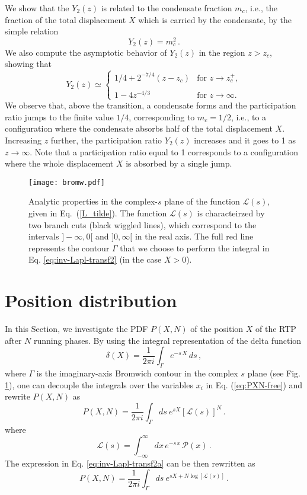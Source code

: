 \documentclass[aps,pre,twocolumn,superscriptaddress,showpacs]{revtex4-1}
\newcommand{\be}{\begin{equation}}
\newcommand{\ee}{\end{equation}}
\newcommand{\mP}{\mathcal{P}}
\newcommand{\mL}{\mathcal{L}}
\begin{document}
We show that the $Y_2(z)$ is related to the condensate fraction $m_c$, i.e., the fraction of the total displacement $X$ which is carried by the condensate, by the simple relation
\begin{equation}
Y_2(z)=m_c^2\,.
\end{equation} 
We also compute the asymptotic behavior of $Y_2(z)$ in the region $z>z_c$, showing that
\begin{equation}
Y_2(z)\simeq\begin{cases}
1/4+2^{-7/4}(z-z_c) & \text{for } z\to z_c^+,\\
\\
1-4 z^{-4/3} & \text{for } z\to\infty.
\end{cases}
\label{mc_lim}
\end{equation}
We observe that, above the transition, a condensate forms and the participation ratio jumps to the finite value $1/4$, corresponding to $m_c=1/2$, i.e., to a configuration where the condensate absorbs half of the total displacement $X$. Increasing $z$ further, the participation ratio $Y_2(z)$ increases and it goes to 1 as $z\to\infty$. Note that a participation ratio equal to 1 corresponds to a configuration where the whole displacement $X$ is absorbed by a single jump.








\begin{figure}
\centering 

\texttt{[image: bromw.pdf]} 
\caption{Analytic properties in the complex-$s$ plane of the function $\mL(s)$, given in Eq.~(\ref{L_tilde}). The function $\mL(s)$ is characteirzed by two branch cuts (black wiggled lines), which correspond to the intervals $]-\infty,0[$ and $]0,\infty[$ in the real axis. The full red line represents the contour $\Gamma$ that we choose to perform the integral in Eq. \eqref{eq:inv-Lapl-transf2} (in the case $X>0$).}
\label{fig:Bromwich}
\end{figure}


\section{Position distribution}

\label{sec:position}


In this Section, we investigate the PDF $P(X,N)$ of the position $X$ of the RTP after $N$ running phases. By using the integral representation
of the delta function
\be
\delta(X)= \frac{1}{2\pi i}\int_{\Gamma} e^{- s\, X}\, ds\,,
\ee
where $\Gamma$ is the imaginary-axis Bromwich contour in the complex $s$ plane (see Fig. \ref{fig:Bromwich}), one can decouple the integrals over the variables $x_i$  in Eq. (\ref{eq:PXN-free}) and rewrite $P(X,N)$ as
\be
P(X,N) = \frac{1}{2\pi i} \int_{\Gamma} ds~e^{sX}\left[\mL(s)\right]^N\,.
\label{eq:inv-Lapl-transf2a}
\ee
where
\be
\mL(s)= \int_{-\infty}^{\infty} dx\, e^{-s\, x}\, \mP(x)\, .
\label{LT.1}
\ee
The expression in Eq. \eqref{eq:inv-Lapl-transf2a} can be then rewritten as
\be
P(X,N) = \frac{1}{2\pi i} \int_{\Gamma} ds~e^{sX+N\log[\mL(s)]}\,.
\label{eq:inv-Lapl-transf2}
\ee
 
\end{document}
